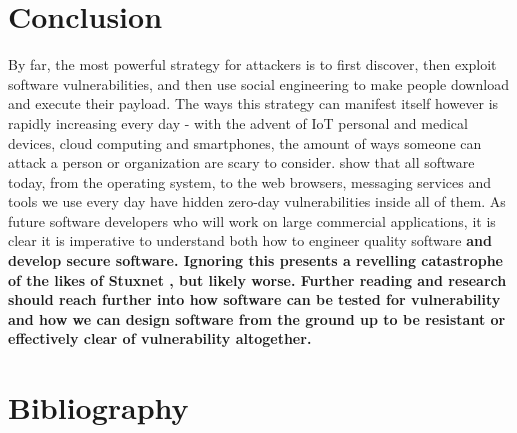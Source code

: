 \documentclass[a4paper, 11pt]{article}
\begin{document}
\section{Conclusion}
By far, the most powerful strategy for attackers is to first discover, then exploit software vulnerabilities, and then use social engineering to make people download and execute their payload. The ways this strategy can manifest itself however is rapidly increasing every day - with the advent of IoT personal and medical devices, cloud computing and smartphones, the amount of ways someone can attack a person or organization are scary to consider. \cite{ref:honeymoonsoftware,ref:sinstsipenyuk2005seven,ref:mcgraw2004software,ref:howardprogrammingsins200519} show that all software today, from the operating system, to the web browsers, messaging services and tools we use every day have hidden zero-day vulnerabilities inside all of them. As future software developers who will work on large commercial applications, it is clear it is imperative to understand both how to engineer quality software \bfseries and \mdseries develop secure software. Ignoring this presents a revelling catastrophe of the likes of Stuxnet \cite{ref:stuxnet2011report}, but likely worse. Further reading and research should reach further into how software can be tested for vulnerability and how we can design software from the ground up to be resistant or effectively clear of vulnerability altogether.

\section{Bibliography}


\end{document}
